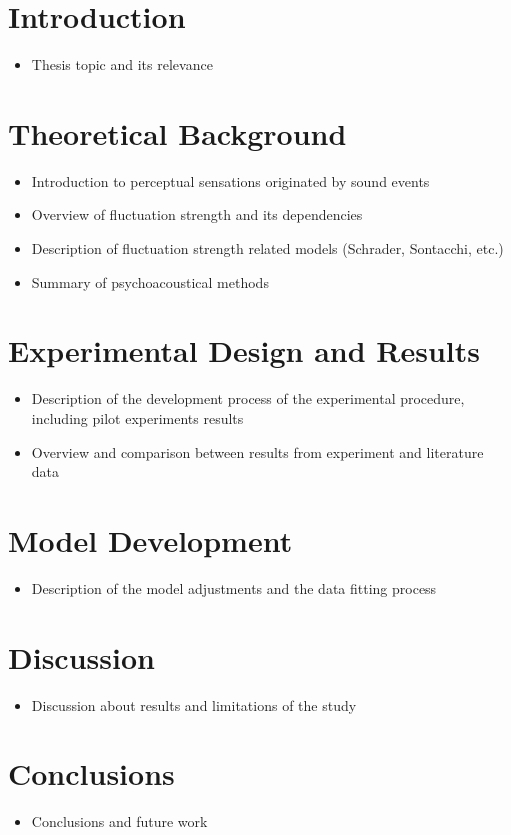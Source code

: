 \documentclass{article}
\begin{document}

\section{Introduction}
\begin{itemize}
  \item Thesis topic and its relevance
\end{itemize}

\section{Theoretical Background}
\begin{itemize}
  \item Introduction to perceptual sensations originated by sound events
  \item Overview of fluctuation strength and its dependencies
  \item Description of fluctuation strength related models (Schrader,
    Sontacchi, etc.)
  \item Summary of psychoacoustical methods
\end{itemize}

\section{Experimental Design and Results}
\begin{itemize}
  \item Description of the development process of the experimental procedure,
    including pilot experiments results
  \item Overview and comparison between results from experiment and literature
    data
\end{itemize}

\section{Model Development}
\begin{itemize}
  \item Description of the model adjustments and the data fitting process
\end{itemize}

\section{Discussion}
\begin{itemize}
  \item Discussion about results and limitations of the study
\end{itemize}

\section{Conclusions}
\begin{itemize}
  \item Conclusions and future work
\end{itemize}
\end{document}
